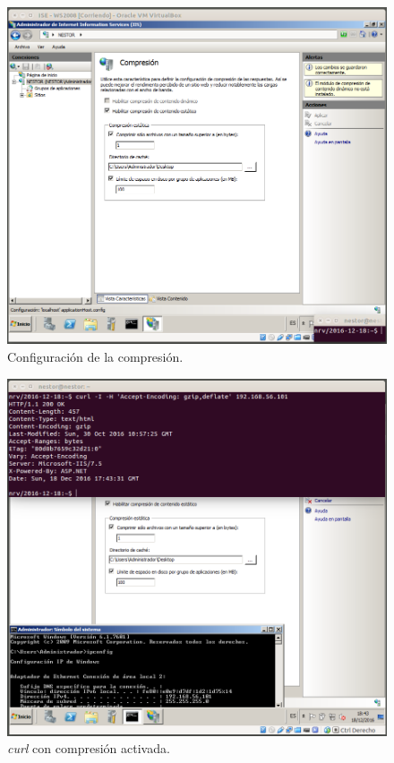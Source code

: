 \documentclass[a4paper,titlepage,12pt]{scrartcl}	%
\numberwithin{figure}{section} %
\numberwithin{table}{section} %
\begin{document}
	\begin{figure}[H]
		\centering
		\includegraphics[scale=0.33]{./Imagenes/5-3.png}
		\caption[Configuración de la compresión.]{Configuración de la compresión.}
		\label{5-3}
	\end{figure}
	
	\begin{figure}[H]
		\centering
		\includegraphics[scale=0.33]{./Imagenes/5-4.png}
		\caption[\textit{curl} con compresión activada.]{\textit{curl} con compresión activada.}
		\label{5-4}
	\end{figure}
	
\end{document}
